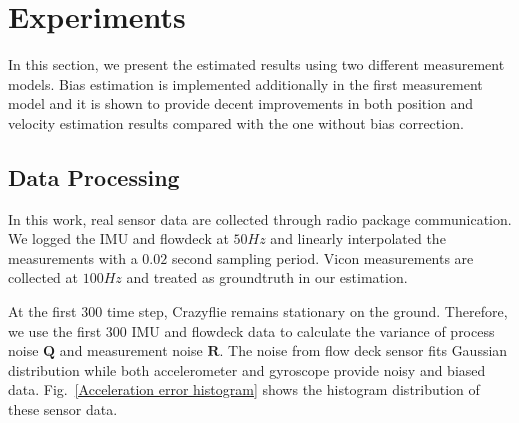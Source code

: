 \documentclass[letterpaper, 10 pt, conference]{ieeeconf}  %
\begin{document}

\section{Experiments}       
In this section, we present the estimated results using two different measurement models. Bias estimation is implemented additionally in the first measurement model and it is shown to provide decent improvements in both position and velocity estimation results compared with the one without bias correction. 
\subsection{Data Processing}
In this work, real sensor data are collected through radio package communication. 
 We logged the IMU and flowdeck at $50 Hz$ and linearly interpolated the measurements with a $0.02$ second sampling period. Vicon measurements are collected at $100 Hz$ and treated as groundtruth in our estimation.
    
At the first $300$ time step, Crazyflie remains stationary on the ground. Therefore, we use the first $300$ IMU and flowdeck data to calculate the variance of process noise $\bm{Q}$ and measurement noise $\bm{R}$. The noise from flow deck sensor fits Gaussian distribution while both accelerometer and gyroscope provide noisy and biased data. Fig.~\ref{Acceleration error histogram} shows the histogram distribution of these sensor data.
\end{document}
